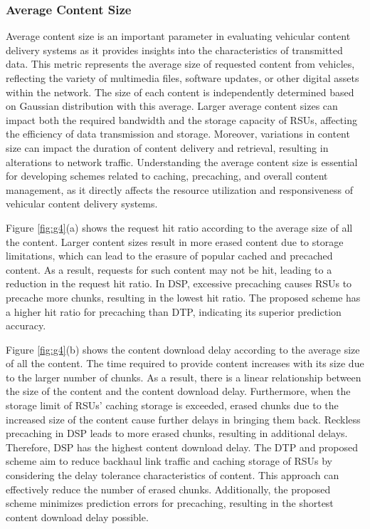 \documentclass[journal]{IEEEtran}
\begin{document}
\subsubsection{Average Content Size}
Average content size is an important parameter in evaluating vehicular content delivery systems as it provides insights into the characteristics of transmitted data.
This metric represents the average size of requested content from vehicles, reflecting the variety of multimedia files, software updates, or other digital assets within the network.
The size of each content is independently determined based on Gaussian distribution with this average.
Larger average content sizes can impact both the required bandwidth and the storage capacity of RSUs, affecting the efficiency of data transmission and storage.
Moreover, variations in content size can impact the duration of content delivery and retrieval, resulting in alterations to network traffic.
Understanding the average content size is essential for developing schemes related to caching, precaching, and overall content management, as it directly affects the resource utilization and responsiveness of vehicular content delivery systems.

Figure \ref{fig:g4}(a) shows the request hit ratio according to the average size of all the content.
Larger content sizes result in more erased content due to storage limitations, which can
lead to the erasure of popular cached and precached content.
As a result, requests for such content may not be hit, leading to a reduction in the request hit ratio.
In DSP, excessive precaching causes RSUs to precache more chunks, resulting in the lowest hit ratio.
The proposed scheme has a higher hit ratio for precaching than DTP, indicating its superior prediction accuracy.

Figure \ref{fig:g4}(b) shows the content download delay according to the average size of all the content.
The time required to provide content increases with its size due to the larger number of chunks.
As a result, there is a linear relationship between the size of the content and the content download delay.
Furthermore, when the storage limit of RSUs' caching storage is exceeded, erased chunks due to the increased size of the content cause further delays in bringing them back.
Reckless precaching in DSP leads to more erased chunks, resulting in additional delays.
Therefore, DSP has the highest content download delay.
The DTP and proposed scheme aim to reduce backhaul link traffic and caching storage of RSUs by considering the delay tolerance characteristics of content.
This approach can effectively reduce the number of erased chunks.
Additionally, the proposed scheme minimizes prediction errors for precaching, resulting in the shortest content download delay possible.
\end{document}
